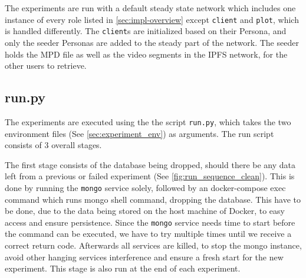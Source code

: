 The experiments are run with a default steady state network which includes one instance of every role listed in \autoref{sec:impl-overview} except \texttt{client} and \texttt{plot}, which is handled differently. The \texttt{client}s are initialized based on their Persona, and only the seeder Personas are added to the steady part of the network.
The seeder holds the \ac{MPD} file as well as the video segments in the \ac{IPFS} network, for the other users to retrieve. 

\subsection{run.py}
\label{sec:experiment_run}
The experiments are executed using the the script \texttt{run.py}, which takes the two environment files (See \autoref{sec:experiment_env}) as arguments. The run script consists of 3 overall stages.

The first stage consists of the database being dropped, should there be any data left from a previous or failed experiment (See \autoref{fig:run_sequence_clean}). This is done by running the \texttt{mongo} service solely, followed by an docker-compose exec command which runs mongo shell command, dropping the database. This have to be done, due to the data being stored on the host machine of Docker, to easy access and ensure persistence. Since the \texttt{mongo} service needs time to start before the command can be executed, we have to try multiple times until  we receive a correct return code. Afterwards all services are killed, to stop the mongo instance, avoid other hanging services interference and ensure a fresh start for the new experiment. This stage is also run at the end of each experiment.




